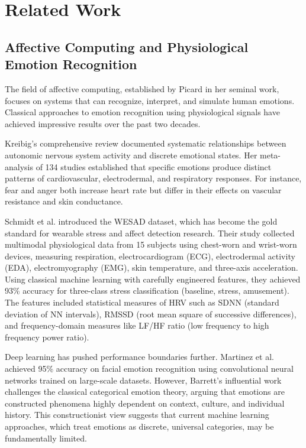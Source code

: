 \documentclass[11pt,letterpaper]{article}
\begin{document}
\section{Related Work}
\label{sec:related}

\subsection{Affective Computing and Physiological Emotion Recognition}

The field of affective computing, established by Picard \cite{picard2000affective} in her seminal work, focuses on systems that can recognize, interpret, and simulate human emotions. Classical approaches to emotion recognition using physiological signals have achieved impressive results over the past two decades.

Kreibig's comprehensive review \cite{kreibig2010autonomic} documented systematic relationships between autonomic nervous system activity and discrete emotional states. Her meta-analysis of 134 studies established that specific emotions produce distinct patterns of cardiovascular, electrodermal, and respiratory responses. For instance, fear and anger both increase heart rate but differ in their effects on vascular resistance and skin conductance.

Schmidt et al. \cite{schmidt2018introducing} introduced the WESAD dataset, which has become the gold standard for wearable stress and affect detection research. Their study collected multimodal physiological data from 15 subjects using chest-worn and wrist-worn devices, measuring respiration, electrocardiogram (ECG), electrodermal activity (EDA), electromyography (EMG), skin temperature, and three-axis acceleration. Using classical machine learning with carefully engineered features, they achieved 93\% accuracy for three-class stress classification (baseline, stress, amusement). The features included statistical measures of HRV such as SDNN (standard deviation of NN intervals), RMSSD (root mean square of successive differences), and frequency-domain measures like LF/HF ratio (low frequency to high frequency power ratio).

Deep learning has pushed performance boundaries further. Martinez et al. \cite{martinez2019facial} achieved 95\% accuracy on facial emotion recognition using convolutional neural networks trained on large-scale datasets. However, Barrett's influential work \cite{barrett2017emotions} challenges the classical categorical emotion theory, arguing that emotions are constructed phenomena highly dependent on context, culture, and individual history. This constructionist view suggests that current machine learning approaches, which treat emotions as discrete, universal categories, may be fundamentally limited.
\end{document}
